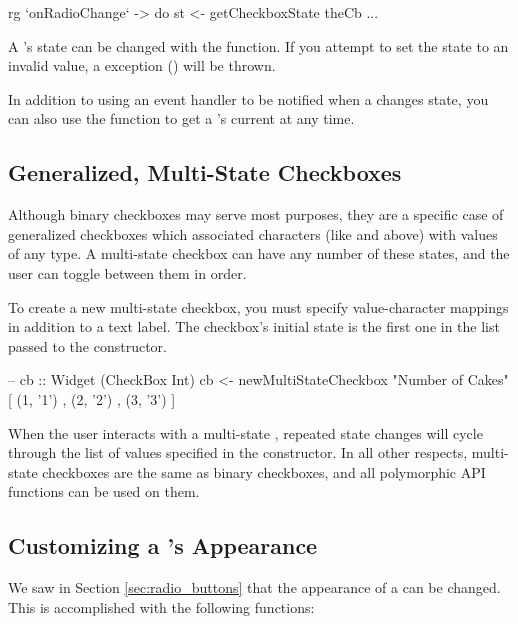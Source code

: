 \begin{haskellcode}
 rg `onRadioChange` \theCb -> do
   st <- getCheckboxState theCb
   ...
\end{haskellcode}

A 's state can be changed with the 
function.  If you attempt to set the state to an invalid value, a
 exception () will be
thrown.

In addition to using an event handler to be notified when a
 changes state, you can also use the
 function to get a 's current
 at any time.

\subsection{Generalized, Multi-State Checkboxes}

Although binary checkboxes may serve most purposes, they are a
specific case of generalized checkboxes which associated characters
(like  and  above) with values of any type.  A
multi-state checkbox can have any number of these states, and the user
can toggle between them in order.

To create a new multi-state checkbox, you must specify value-character
mappings in addition to a text label.  The checkbox's initial state is
the first one in the list passed to the constructor.

\begin{haskellcode}
 -- cb :: Widget (CheckBox Int)
 cb <- newMultiStateCheckbox "Number of Cakes" [ (1, '1')
                                               , (2, '2')
                                               , (3, '3')
                                               ]
\end{haskellcode}

When the user interacts with a multi-state , repeated
state changes will cycle through the list of values specified in the
constructor.  In all other respects, multi-state checkboxes are the
same as binary checkboxes, and all polymorphic API functions can be
used on them.

\subsection{Customizing a 's Appearance}

We saw in Section \ref{sec:radio_buttons} that the appearance of a
 can be changed.  This is accomplished with the following
functions:

